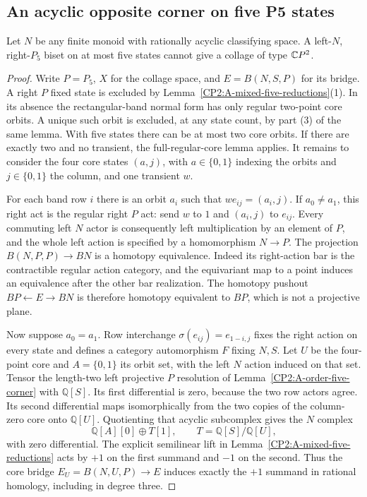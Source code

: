 \subsection{An acyclic opposite corner on five P5 states}

\begin{proposition}
\label{CP2:A-P5-five-state-acyclic-opposite}
Let $N$ be any finite monoid with rationally acyclic
classifying space. A left-$N$, right-$P_5$ biset on at most
five states cannot give a collage of type $\mathbb{C}P^2$.
\end{proposition}
\begin{proof}
Write $P=P_5$, $X$ for the collage space, and $E=B(N,S,P)$
for its bridge. A right $P$ fixed state is excluded by
Lemma~\ref{CP2:A-mixed-five-reductions}(1).
In its absence the rectangular-band normal form has only
regular two-point core orbits. A unique such orbit is
excluded, at any state count, by part (3) of the same lemma.
With five states there can be at most two core orbits.
If there are exactly two and no transient, the full-regular-core
lemma applies. It remains to consider the four core states
$(a,j)$, with $a\in\{0,1\}$ indexing the orbits and
$j\in\{0,1\}$ the column, and one transient $w$.

For each band row $i$ there is an orbit $a_i$ such that
$we_{ij}=(a_i,j)$. If $a_0\ne a_1$, this right act is
the regular right $P$ act: send $w$ to $1$ and
$(a_i,j)$ to $e_{ij}$. Every commuting left $N$ actor
is consequently left multiplication by an element of $P$,
and the whole left action is specified by a homomorphism
$N\to P$. The projection $B(N,P,P)\to BN$ is a homotopy
equivalence. Indeed its right-action bar is the contractible
regular action category, and the equivariant map to a point
induces an equivalence after the other bar realization.
The homotopy pushout $BP\leftarrow E\to BN$ is therefore
homotopy equivalent to $BP$, which is not a projective plane.

Now suppose $a_0=a_1$. Row interchange
$\sigma(e_{ij})=e_{1-i,j}$ fixes the right action on every
state and defines a category automorphism $F$ fixing $N,S$.
Let $U$ be the four-point core and $A=\{0,1\}$ its orbit set,
with the left $N$ action induced on that set. Tensor the
length-two left projective $P$ resolution of
Lemma~\ref{CP2:A-order-five-corner} with $\mathbb Q[S]$.
Its first differential is zero, because the two row actors
agree. Its second differential maps isomorphically from
the two copies of the column-zero core onto $\mathbb Q[U]$.
Quotienting that acyclic subcomplex gives the $N$ complex
\[
 \mathbb Q[A][0]\oplus T[1],
 \qquad T=\mathbb Q[S]/\mathbb Q[U],
\]
with zero differential. The explicit semilinear lift in
Lemma~\ref{CP2:A-mixed-five-reductions} acts by $+1$ on
the first summand and $-1$ on the second. Thus the core
bridge $E_U=B(N,U,P)\to E$ induces exactly the $+1$
summand in rational homology, including in degree three.


\end{proof}
